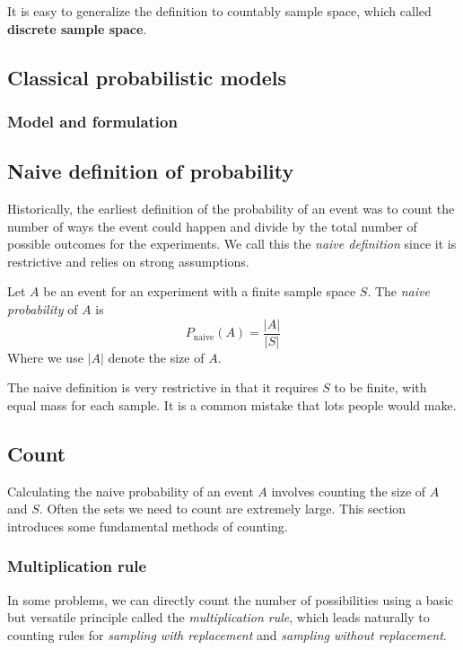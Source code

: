 It is easy to generalize the definition to countably sample space, which called \textbf{discrete sample space}.

\subsection{Classical probabilistic models}

\subsubsection{Model and formulation}

\subsection{Naive definition of probability}

Historically, the earliest definition of the probability of an event was to count the number of ways the event could happen and divide by the total number of possible outcomes for the experiments. We call this the \textit{naive definition} since it is restrictive and relies on strong assumptions.

\begin{defn}
    Let $A$ be an event for an experiment with a finite sample space $S$. The \textit{naive probability} of $A$ is 
    $$
    P_{\text{naive}}(A) = \frac{|A|}{|S|}
    $$
    Where we use $|A|$ denote the size of $A$.
\end{defn}

The naive definition is very restrictive in that it requires $S$ to be finite, with equal mass for each sample. It is a common mistake that lots people would make.

\subsection{Count}

Calculating the naive probability of an event $A$ involves counting the size of $A$ and $S$. Often the sets we need to count are extremely large. This section introduces some fundamental methods of counting.

\subsubsection{Multiplication rule}

In some problems, we can directly count the number of possibilities using a basic but versatile principle called the \textit{multiplication rule}, which leads naturally to counting rules for \textit{sampling with replacement} and \textit{sampling without replacement}.

